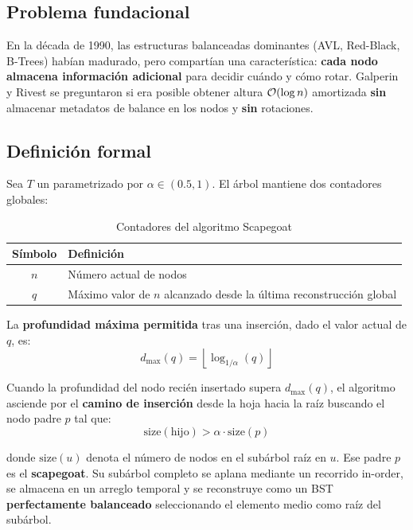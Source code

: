 \subsection{Problema fundacional}

En la década de 1990, las estructuras balanceadas dominantes (AVL, Red-Black, B-Trees) habían madurado, pero compartían una característica: \textbf{cada nodo almacena información adicional} para decidir cuándo y cómo rotar. Galperin y Rivest se preguntaron si era posible obtener altura $\mathcal{O}(\log n)$ amortizada \textbf{sin} almacenar metadatos de balance en los nodos y \textbf{sin} rotaciones.

\subsection{Definición formal}

Sea $T$ un \Scapegoat{} parametrizado por $\alpha \in (0.5, 1)$. El árbol mantiene dos contadores globales:

\begin{table}[H]
  \centering
  \caption{Contadores del algoritmo Scapegoat}
  \begin{tabular}{@{}cl@{}}
    \toprule
    \textbf{Símbolo} & \textbf{Definición} \\
    \midrule
    $n$ & Número actual de nodos \\
    $q$ & Máximo valor de $n$ alcanzado desde la última reconstrucción global \\
    \bottomrule
  \end{tabular}
\end{table}

La \textbf{profundidad máxima permitida} tras una inserción, dado el valor actual de $q$, es:
\begin{equation}
  d_{\max}(q) = \left\lfloor \log_{1/\alpha}(q) \right\rfloor
  \label{eq:dmax}
\end{equation}

Cuando la profundidad del nodo recién insertado supera $d_{\max}(q)$, el algoritmo asciende por el \textbf{camino de inserción} desde la hoja hacia la raíz buscando el nodo padre $p$ tal que:
\begin{equation}
  \mathrm{size}(\mathrm{hijo}) > \alpha \cdot \mathrm{size}(p)
  \label{eq:scapegoat-cond}
\end{equation}

donde $\mathrm{size}(u)$ denota el número de nodos en el subárbol raíz en $u$. Ese padre $p$ es el \textbf{scapegoat}. Su subárbol completo se aplana mediante un recorrido in-order, se almacena en un arreglo temporal y se reconstruye como un BST \textbf{perfectamente balanceado} seleccionando el elemento medio como raíz del subárbol.

